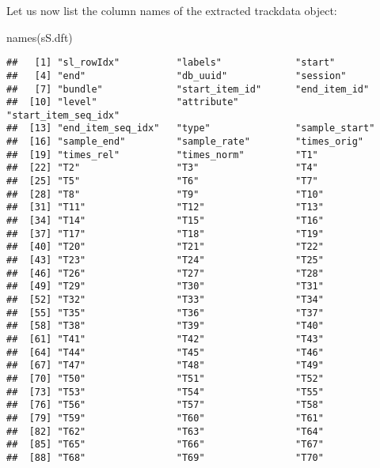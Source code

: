 \documentclass[
]{book}
\newenvironment{Shaded}{\begin{snugshade}}{\end{snugshade}}
\newcommand{\FunctionTok}[1]{\textcolor[rgb]{0.00,0.00,0.00}{#1}}
\newcommand{\NormalTok}[1]{#1}
\begin{document}
Let us now list the column names of the extracted trackdata object:

\begin{Shaded}
\begin{Highlighting}[]
\FunctionTok{names}\NormalTok{(sS.dft)}
\end{Highlighting}
\end{Shaded}

\begin{verbatim}
##   [1] "sl_rowIdx"          "labels"             "start"             
##   [4] "end"                "db_uuid"            "session"           
##   [7] "bundle"             "start_item_id"      "end_item_id"       
##  [10] "level"              "attribute"          "start_item_seq_idx"
##  [13] "end_item_seq_idx"   "type"               "sample_start"      
##  [16] "sample_end"         "sample_rate"        "times_orig"        
##  [19] "times_rel"          "times_norm"         "T1"                
##  [22] "T2"                 "T3"                 "T4"                
##  [25] "T5"                 "T6"                 "T7"                
##  [28] "T8"                 "T9"                 "T10"               
##  [31] "T11"                "T12"                "T13"               
##  [34] "T14"                "T15"                "T16"               
##  [37] "T17"                "T18"                "T19"               
##  [40] "T20"                "T21"                "T22"               
##  [43] "T23"                "T24"                "T25"               
##  [46] "T26"                "T27"                "T28"               
##  [49] "T29"                "T30"                "T31"               
##  [52] "T32"                "T33"                "T34"               
##  [55] "T35"                "T36"                "T37"               
##  [58] "T38"                "T39"                "T40"               
##  [61] "T41"                "T42"                "T43"               
##  [64] "T44"                "T45"                "T46"               
##  [67] "T47"                "T48"                "T49"               
##  [70] "T50"                "T51"                "T52"               
##  [73] "T53"                "T54"                "T55"               
##  [76] "T56"                "T57"                "T58"               
##  [79] "T59"                "T60"                "T61"               
##  [82] "T62"                "T63"                "T64"               
##  [85] "T65"                "T66"                "T67"               
##  [88] "T68"                "T69"                "T70"               

\end{verbatim}
\end{document}
